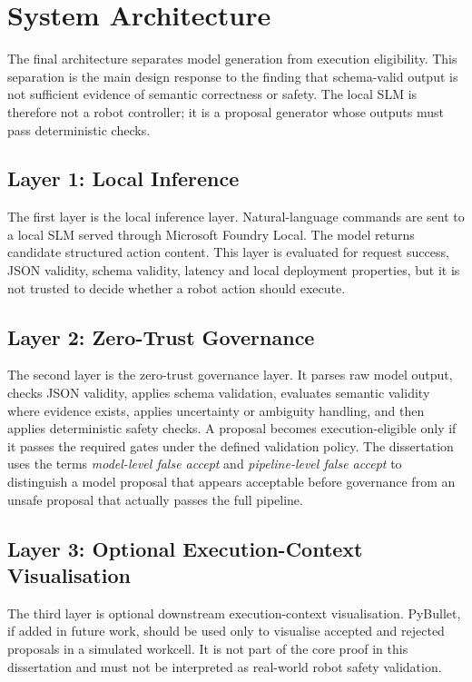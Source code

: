 \section{System Architecture}
\label{sec:system_architecture}

The final architecture separates model generation from execution eligibility. This separation is the main design response to the finding that schema-valid output is not sufficient evidence of semantic correctness or safety. The local SLM is therefore not a robot controller; it is a proposal generator whose outputs must pass deterministic checks.

\subsection{Layer 1: Local Inference}

The first layer is the local inference layer. Natural-language commands are sent to a local SLM served through Microsoft Foundry Local. The model returns candidate structured action content. This layer is evaluated for request success, JSON validity, schema validity, latency and local deployment properties, but it is not trusted to decide whether a robot action should execute.

\subsection{Layer 2: Zero-Trust Governance}

The second layer is the zero-trust governance layer. It parses raw model output, checks JSON validity, applies schema validation, evaluates semantic validity where evidence exists, applies uncertainty or ambiguity handling, and then applies deterministic safety checks. A proposal becomes execution-eligible only if it passes the required gates under the defined validation policy. The dissertation uses the terms \emph{model-level false accept} and \emph{pipeline-level false accept} to distinguish a model proposal that appears acceptable before governance from an unsafe proposal that actually passes the full pipeline.

\subsection{Layer 3: Optional Execution-Context Visualisation}

The third layer is optional downstream execution-context visualisation. PyBullet, if added in future work, should be used only to visualise accepted and rejected proposals in a simulated workcell. It is not part of the core proof in this dissertation and must not be interpreted as real-world robot safety validation.

